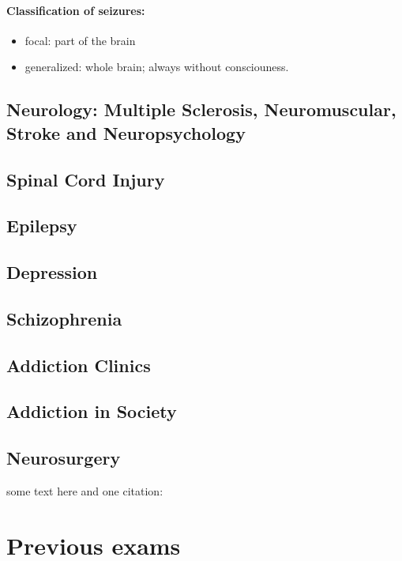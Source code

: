\documentclass[12pt,article,oneside,a4paper]{memoir}
\begin{document}
\paragraph{Classification of seizures:}
\begin{itemize}
\item focal: part of the brain
\item generalized: whole brain; always without consciouness.
\end{itemize}

\subsection{Neurology: Multiple Sclerosis, Neuromuscular, Stroke and Neuropsychology}
\subsection{Spinal Cord Injury}

\subsection{Epilepsy}
 
\subsection{Depression}

\subsection{Schizophrenia}

\subsection{Addiction Clinics}

\subsection{Addiction in Society}

\subsection{Neurosurgery}
some text here and one citation: \cite{Example}

\newpage


\section{Previous exams}
\end{document}
